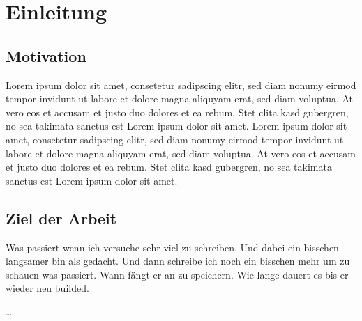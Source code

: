 \graphicspath{{Einleitung/img/}}
\chapter{Einleitung}\label{sec:einleitung}

\section{Motivation}\label{sec:motivation}

Lorem ipsum dolor sit amet, consetetur sadipscing elitr, sed diam nonumy eirmod
tempor invidunt ut labore et dolore magna aliquyam erat, sed diam voluptua. At
vero eos et accusam et justo duo dolores et ea rebum. Stet clita kasd
gubergren, no sea takimata sanctus est Lorem ipsum dolor sit amet. Lorem ipsum
dolor sit amet, consetetur sadipscing elitr, sed diam nonumy eirmod tempor
invidunt ut labore et dolore magna aliquyam erat, sed diam voluptua. At vero
eos et accusam et justo duo dolores et ea rebum. Stet clita kasd gubergren, no
sea takimata sanctus est Lorem ipsum dolor sit amet.


\section{Ziel der Arbeit}\label{sec:ziel_der_arbeit}
Was passiert wenn ich versuche sehr viel zu schreiben. Und dabei ein bisschen langsamer bin als gedacht. Und dann schreibe ich noch ein bisschen mehr um zu schauen was passiert. Wann fängt er an zu speichern. Wie lange dauert es bis er wieder neu builded.

\ldots


